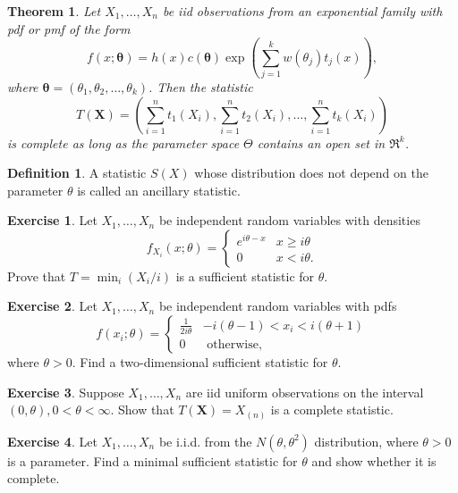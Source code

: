 \documentclass{article}
\newtheorem*{theorem*}{Theorem}
\theoremstyle{definition}
\newtheorem*{definition*}{Definition}
\newtheorem*{exercise*}{Exercise}
\begin{document}
	\begin{theorem*}
		Let $X_1, \ldots, X_n$ be iid observations from an exponential family with pdf or pmf of the form
		$$
		f(x;\boldsymbol{\theta})=h(x) c(\boldsymbol{\theta}) \exp \left(\sum_{j=1}^k w\left(\theta_j\right) t_j(x)\right),
		$$
		where $\boldsymbol{\theta}=\left(\theta_1, \theta_2, \ldots, \theta_k\right)$. Then the statistic
		$$
		T(\mathbf{X})=\left(\sum_{i=1}^n t_1\left(X_i\right), \sum_{i=1}^n t_2\left(X_i\right), \ldots, \sum_{i=1}^n t_k\left(X_i\right)\right)
		$$
		is complete as long as the parameter space $\Theta$ contains an open set in $\Re^k$.
	\end{theorem*}
	\begin{definition*}
		A statistic $S(X)$ whose distribution does not depend on the parameter $\theta$ is called an ancillary statistic.
		
	\end{definition*}
	\begin{exercise*}
		Let $X_1, \ldots, X_n$ be independent random variables with densities
		$$
		f_{X_i}(x; \theta)=\left\{\begin{array}{ll}
			e^{i \theta-x} & x \geq i \theta \\
			0 & x<i \theta .
		\end{array} \right.
		$$
		Prove that $T=\min _i\left(X_i / i\right)$ is a sufficient statistic for $\theta$.
	\end{exercise*}
	\begin{exercise*}
		Let $X_1, \ldots, X_n$ be independent random variables with pdfs
		$$
		f\left(x_i ; \theta\right)= \begin{cases}\frac{1}{2 i \theta} & -i(\theta-1)<x_i<i(\theta+1) \\ 0 & \text { otherwise},\end{cases}
		$$
		where $\theta>0$. Find a two-dimensional sufficient statistic for $\theta$.
	\end{exercise*}
	\begin{exercise*}
		Suppose $X_1, \ldots, X_n$ are iid uniform observations on the interval $(0, \theta),0<\theta<\infty$. Show that $T(\mathbf{X})=X_{(n)}$ is a complete statistic.
	\end{exercise*}
		\begin{exercise*}
		Let $X_1, \ldots, X_n$ be i.i.d. from the $N\left(\theta, \theta^2\right)$ distribution, where $\theta>0$ is a parameter. Find a minimal sufficient statistic for $\theta$ and show whether it is complete.
	\end{exercise*}
	
\end{document}
